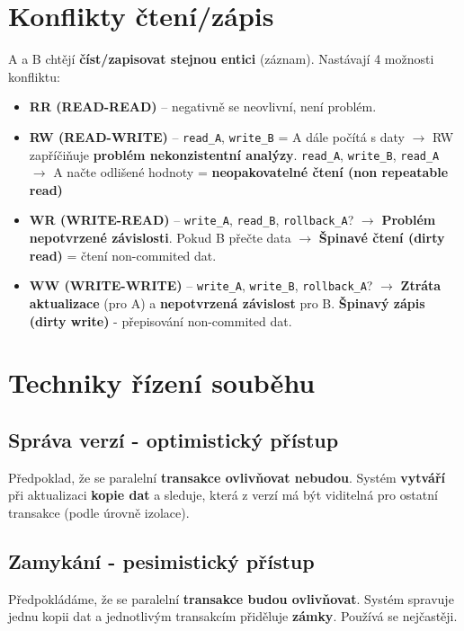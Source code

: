 \section{Konflikty čtení/zápis}
A a B chtějí \textbf{číst/zapisovat stejnou entici} (záznam). Nastávají 4 možnosti konfliktu:
\begin{itemize}
    \item \textbf{RR (READ-READ)} -- negativně se neovlivní, není problém.
    \item \textbf{RW (READ-WRITE)} -- \texttt{read\_A}, \texttt{write\_B} = A dále počítá s daty $\rightarrow$ RW zapříčiňuje \textbf{problém nekonzistentní analýzy}. \texttt{read\_A}, \texttt{write\_B}, \texttt{read\_A} $\rightarrow$ A načte odlišené hodnoty = \textbf{neopakovatelné čtení (non repeatable read)}
    \item \textbf{WR (WRITE-READ)} -- \texttt{write\_A}, \texttt{read\_B}, \texttt{rollback\_A}? $\rightarrow$ \textbf{Problém nepotvrzené závislosti}. Pokud B přečte data $\rightarrow$ \textbf{Špinavé čtení (dirty read)} = čtení non-commited dat.
    \item \textbf{WW (WRITE-WRITE)} -- \texttt{write\_A}, \texttt{write\_B}, \texttt{rollback\_A}? $\rightarrow$ \textbf{Ztráta aktualizace} (pro A) a \textbf{nepotvrzená závislost} pro B. \textbf{Špinavý zápis}\textbf{ (dirty write)} - přepisování non-commited dat.
\end{itemize}

\section{Techniky řízení souběhu}
\subsection{Správa verzí - optimistický přístup}
Předpoklad, že se paralelní \textbf{transakce ovlivňovat nebudou}. Systém \textbf{vytváří} při aktualizaci\textbf{ kopie dat }a sleduje, která z verzí má být viditelná pro ostatní transakce (podle úrovně izolace).

\subsection{Zamykání - pesimistický přístup}
Předpokládáme, že se paralelní \textbf{transakce budou ovlivňovat}. Systém spravuje jednu kopii dat a jednotlivým transakcím přiděluje \textbf{zámky}. Používá se nejčastěji.

